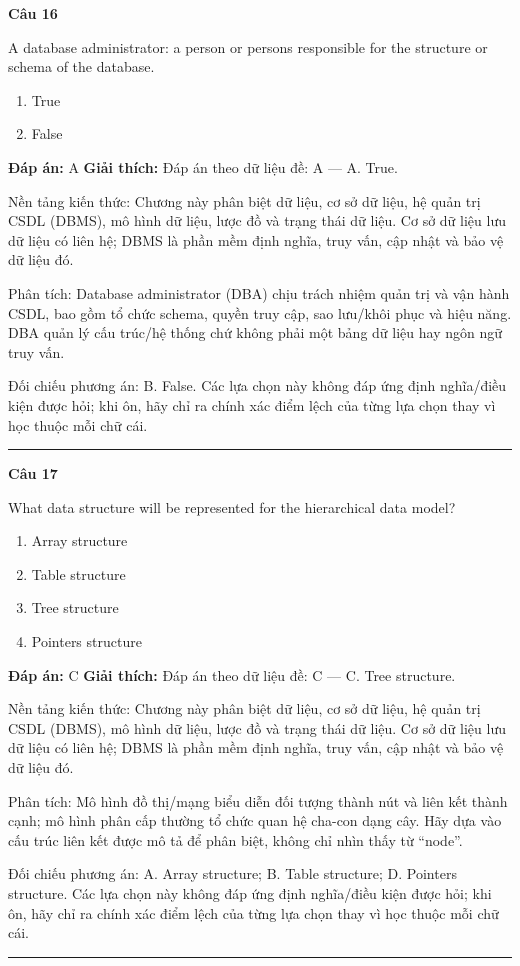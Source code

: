 \documentclass[11pt,a4paper]{article}
\newenvironment{question}[1]{%
  \par\vspace{1em}\noindent\textbf{\large Câu #1}\par\vspace{0.4em}
}{%
  \par\vspace{1em}\hrule\vspace{0.6em}
}
\newenvironment{choices}{%
  \begin{enumerate}[label=\textbf{\Alph*.},leftmargin=2.2em,itemsep=2pt,topsep=3pt]
}{%
  \end{enumerate}
}
\newcommand{\choice}{\item}
\begin{document}
\begin{question}{16}
A database administrator: a person or persons responsible for the structure or schema of the database.
\begin{choices}
\choice True
\choice False
\end{choices}
\textbf{Đáp án:} A
\textbf{Giải thích:} Đáp án theo dữ liệu đề: A — A. True.

Nền tảng kiến thức: Chương này phân biệt dữ liệu, cơ sở dữ liệu, hệ quản trị CSDL (DBMS), mô hình dữ liệu, lược đồ và trạng thái dữ liệu. Cơ sở dữ liệu lưu dữ liệu có liên hệ; DBMS là phần mềm định nghĩa, truy vấn, cập nhật và bảo vệ dữ liệu đó.

Phân tích: Database administrator (DBA) chịu trách nhiệm quản trị và vận hành CSDL, bao gồm tổ chức schema, quyền truy cập, sao lưu/khôi phục và hiệu năng. DBA quản lý cấu trúc/hệ thống chứ không phải một bảng dữ liệu hay ngôn ngữ truy vấn.

Đối chiếu phương án: B. False. Các lựa chọn này không đáp ứng định nghĩa/điều kiện được hỏi; khi ôn, hãy chỉ ra chính xác điểm lệch của từng lựa chọn thay vì học thuộc mỗi chữ cái.
\end{question}

\begin{question}{17}
What data structure will be represented for the hierarchical data model?
\begin{choices}
\choice Array structure
\choice Table structure
\choice Tree structure
\choice Pointers structure
\end{choices}
\textbf{Đáp án:} C
\textbf{Giải thích:} Đáp án theo dữ liệu đề: C — C. Tree structure.

Nền tảng kiến thức: Chương này phân biệt dữ liệu, cơ sở dữ liệu, hệ quản trị CSDL (DBMS), mô hình dữ liệu, lược đồ và trạng thái dữ liệu. Cơ sở dữ liệu lưu dữ liệu có liên hệ; DBMS là phần mềm định nghĩa, truy vấn, cập nhật và bảo vệ dữ liệu đó.

Phân tích: Mô hình đồ thị/mạng biểu diễn đối tượng thành nút và liên kết thành cạnh; mô hình phân cấp thường tổ chức quan hệ cha-con dạng cây. Hãy dựa vào cấu trúc liên kết được mô tả để phân biệt, không chỉ nhìn thấy từ “node”.

Đối chiếu phương án: A. Array structure; B. Table structure; D. Pointers structure. Các lựa chọn này không đáp ứng định nghĩa/điều kiện được hỏi; khi ôn, hãy chỉ ra chính xác điểm lệch của từng lựa chọn thay vì học thuộc mỗi chữ cái.
\end{question}
\end{document}
